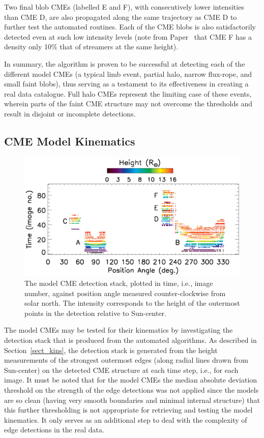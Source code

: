 \documentclass[preprint2]{aastex}
\newcommand{\RNum}[1]{\uppercase\expandafter{\romannumeral #1\relax}}
\begin{document}
Two final blob CMEs (labelled E and F), with consecutively lower intensities than CME D, are also propagated along the same trajectory as CME D to further test the automated routines. Each of the CME blobs is also satisfactorily detected even at such low intensity levels (note from Paper~\RNum{1} that CME F has a density only 10\% that of streamers at the same height).

In summary, the algorithm is proven to be successful at detecting each of the different model CMEs (a typical limb event, partial halo, narrow flux-rope, and small faint blobs), thus serving as a testament to its effectiveness in creating a real data catalogue. Full halo CMEs represent the limiting case of these events, wherein parts of the faint CME structure may not overcome the thresholds and result in disjoint or incomplete detections.


\subsection{CME Model Kinematics}

\begin{figure}[!t]
\centerline{\includegraphics[scale=0.57, clip=true, trim=0 0 0 0, width=\linewidth]{images/figure_model_stack.eps}}
\caption{The model CME detection stack, plotted in time, i.e., image number, against position angle measured counter-clockwise from solar north. The intensity corresponds to the height of the outermost points in the detection relative to Sun-center.}
\label{figure_model_stack}
\end{figure}

The model CMEs may be tested for their kinematics by investigating the detection stack that is produced from the automated algorithms. As described in Section~\ref{sect_kins}, the detection stack is generated from the height measurements of the strongest outermost edges (along radial lines drawn from Sun-center) on the detected CME structure at each time step, i.e., for each image. It must be noted that for the model CMEs the median absolute deviation threshold on the strength of the edge detections was not applied since the models are so clean (having very smooth boundaries and minimal internal structure) that this further thresholding is not appropriate for retrieving and testing the model kinematics. It only serves as an additional step to deal with the complexity of edge detections in the real data.
\end{document}
